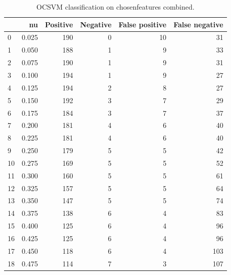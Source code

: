 \documentclass[a4paper,twoside,12pt]{book}
\begin{document}
\begin{appendices}

\begin{table}
	\centering
	\caption{OCSVM classification on chosenfeatures combined.}
	\label{id:tab:OCSVMonProc}
	\begin{tabular}{lrrrrr}
		\toprule
		{} &     nu &  Positive &  Negative &  False positive &  False negative \\
		\midrule
		0  &  0.025 &       190 &         0 &              10 &              31 \\
		1  &  0.050 &       188 &         1 &               9 &              33 \\
		2  &  0.075 &       190 &         1 &               9 &              31 \\
		3  &  0.100 &       194 &         1 &               9 &              27 \\
		4  &  0.125 &       194 &         2 &               8 &              27 \\
		5  &  0.150 &       192 &         3 &               7 &              29 \\
		6  &  0.175 &       184 &         3 &               7 &              37 \\
		7  &  0.200 &       181 &         4 &               6 &              40 \\
		8  &  0.225 &       181 &         4 &               6 &              40 \\
		9  &  0.250 &       179 &         5 &               5 &              42 \\
		10 &  0.275 &       169 &         5 &               5 &              52 \\
		11 &  0.300 &       160 &         5 &               5 &              61 \\
		12 &  0.325 &       157 &         5 &               5 &              64 \\
		13 &  0.350 &       147 &         5 &               5 &              74 \\
		14 &  0.375 &       138 &         6 &               4 &              83 \\
		15 &  0.400 &       125 &         6 &               4 &              96 \\
		16 &  0.425 &       125 &         6 &               4 &              96 \\
		17 &  0.450 &       118 &         6 &               4 &             103 \\
		18 &  0.475 &       114 &         7 &               3 &             107 \\

\end{tabular}
\end{table}
\end{appendices}
\end{document}
